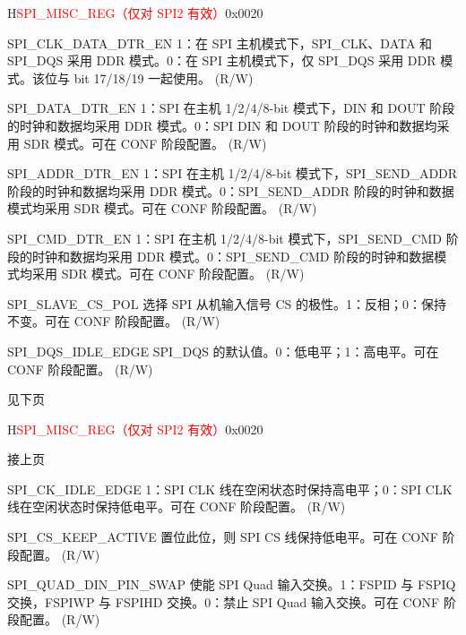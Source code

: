 \begin{register}{H}{\textcolor{red}{SPI\_MISC\_REG（仅对 SPI2 有效）}}{0x{}0020}
\begin{regdesc}
\begin{reglist}
\label{fielddesc:SPICLKDATADTREN}\item [SPI\_CLK\_DATA\_DTR\_EN] 1：在 SPI 主机模式下，SPI\_CLK、DATA 和 SPI\_DQS 采用 DDR 模式。0：在 SPI 主机模式下，仅 SPI\_DQS 采用 DDR 模式。该位与 bit 17/18/19 一起使用。 (R/W)
\label{fielddesc:SPIDATADTREN}\item [SPI\_DATA\_DTR\_EN] 1：SPI 在主机 1/2/4/8-bit 模式下，DIN 和 DOUT 阶段的时钟和数据均采用 DDR 模式。0：SPI DIN 和 DOUT 阶段的时钟和数据均采用 SDR 模式。可在 CONF 阶段配置。 (R/W)
\label{fielddesc:SPIADDRDTREN}\item [SPI\_ADDR\_DTR\_EN] 1：SPI 在主机 1/2/4/8-bit 模式下，SPI\_SEND\_ADDR 阶段的时钟和数据均采用 DDR 模式。0：SPI\_SEND\_ADDR 阶段的时钟和数据模式均采用 SDR 模式。可在 CONF 阶段配置。 (R/W)
\label{fielddesc:SPICMDDTREN}\item [SPI\_CMD\_DTR\_EN] 1：SPI 在主机 1/2/4/8-bit 模式下，SPI\_SEND\_CMD 阶段的时钟和数据均采用 DDR 模式。0：SPI\_SEND\_CMD 阶段的时钟和数据模式均采用 SDR 模式。可在 CONF 阶段配置。 (R/W)
\label{fielddesc:SPISLAVECSPOL}\item [SPI\_SLAVE\_CS\_POL] 选择 SPI 从机输入信号 CS 的极性。1：反相；0：保持不变。可在 CONF 阶段配置。 (R/W)
\label{fielddesc:SPIDQSIDLEEDGE}\item [SPI\_DQS\_IDLE\_EDGE] SPI\_DQS 的默认值。0：低电平；1：高电平。可在 CONF 阶段配置。 (R/W)
\item [见下页]
\end{reglist}\end{regdesc}
\end{register}

\addtocounter{Regfloat}{-1}
\begin{register}{H}{\textcolor{red}{SPI\_MISC\_REG（仅对 SPI2 有效）}}{0x{}0020}
\begin{regdesc}\begin{reglist}
\item [接上页]
\label{fielddesc:SPICKIDLEEDGE}\item [SPI\_CK\_IDLE\_EDGE] 1：SPI CLK 线在空闲状态时保持高电平；0：SPI CLK 线在空闲状态时保持低电平。可在 CONF 阶段配置。 (R/W)
\label{fielddesc:SPICSKEEPACTIVE}\item [SPI\_CS\_KEEP\_ACTIVE] 置位此位，则 SPI CS 线保持低电平。可在 CONF 阶段配置。 (R/W)
\label{fielddesc:SPIQUADDINPINSWAP}\item [SPI\_QUAD\_DIN\_PIN\_SWAP] 使能 SPI Quad 输入交换。1：FSPID 与 FSPIQ 交换，FSPIWP 与 FSPIHD 交换。0：禁止 SPI Quad 输入交换。可在 CONF 阶段配置。 (R/W)
\end{reglist}\end{regdesc}
\end{register}

